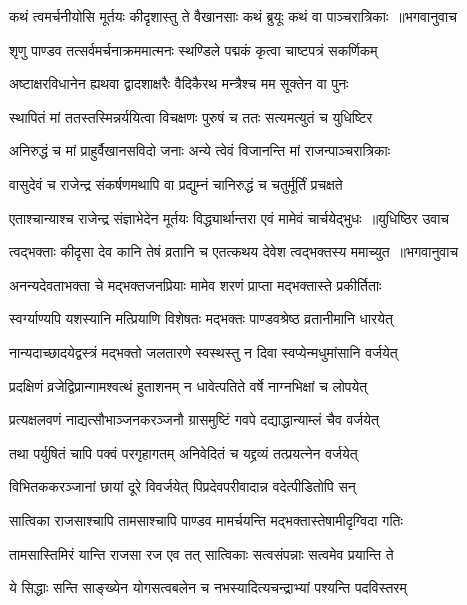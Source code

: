 \threelineshloka
{कथं त्वमर्चनीयोसि मूर्तयः कीदृशास्तु ते}
{वैखानसाः कथं ब्रुयूः कथं वा पाञ्चरात्रिकाः ॥भगवानुवाच}
{}


\twolineshloka
{शृणु पाण्डव तत्सर्वमर्चनाक्रममात्मनः}
{स्थण्डिले पद्मकं कृत्वा चाष्टपत्रं सकर्णिकम्}


\twolineshloka
{अष्टाक्षरविधानेन ह्यथवा द्वादशाक्षरैः}
{वैदिकैरथ मन्त्रैश्च मम सूक्तेन वा पुनः}


\twolineshloka
{स्थापितं मां ततस्तस्मिन्नर्ययित्वा विचक्षणः}
{पुरुषं च ततः सत्यमत्युतं च युधिष्टिर}


\threelineshloka
{अनिरुद्धं च मां प्राहुर्वैखानसविदो जनाः}
{अन्ये त्वेवं विजानन्ति मां राजन्पाञ्चरात्रिकाः}
{}


\twolineshloka
{वासुदेवं च राजेन्द्र संकर्षणमथापि वा}
{प्रद्युम्नं चानिरुद्धं च चतुर्मूर्तिं प्रचक्षते}


\threelineshloka
{एताश्चान्याश्च राजेन्द्र संज्ञाभेदेन मूर्तयः}
{विद्ध्यार्थान्तरा एवं मामेवं चार्चयेद्भुधः ॥युधिष्ठिर उवाच}
{}


\threelineshloka
{त्वद्भक्ताः कीदृसा देव कानि तेषं व्रतानि च}
{एतत्कथय देवेश त्वद्भक्तस्य ममाच्युत ॥भगवानुवाच}
{}


\twolineshloka
{अनन्यदेवताभक्ता चे मद्भक्तजनप्रियाः}
{मामेव शरणं प्राप्ता मद्भक्तास्ते प्रकीर्तिताः}


\twolineshloka
{स्वर्ग्याण्यपि यशस्यानि मत्प्रियाणि विशेषतः}
{मद्भक्तः पाण्डवश्रेष्ठ व्रतानीमानि धारयेत्}


\twolineshloka
{नान्यदाच्छादयेद्वस्त्रं मद्भक्तो जलतारणे}
{स्वस्थस्तु न दिवा स्वप्येन्मधुमांसानि वर्जयेत्}


\twolineshloka
{प्रदक्षिणं व्रजेद्विप्रान्गामश्वत्थं हुताशनम्}
{न धावेत्पतिते वर्षे नाग्नभिक्षां च लोपयेत्}


\twolineshloka
{प्रत्यक्षलवणं नाद्यत्सौभाञ्जनकरञ्जनौ}
{ग्रासमुष्टिं गवपे दद्याद्धान्याम्लं चैव वर्जयेत्}


\twolineshloka
{तथा पर्युषितं चापि पक्वं परगृहागतम्}
{अनिवेदितं च यद्द्रव्यं तत्प्रयत्नेन वर्जयेत्}


\twolineshloka
{विभितककरञ्जानां छायां दूरे विवर्जयेत्}
{पिप्रदेवपरीवादान्न वदेत्पीडितोपि सन्}


\twolineshloka
{सात्विका राजसाश्चापि तामसाश्चापि पाण्डव}
{मामर्चयन्ति मद्भक्तास्तेषामीदृग्विदा गतिः}


\twolineshloka
{तामसास्तिमिरं यान्ति राजसा रज एव तत्}
{सात्विकाः सत्वसंपन्नाः सत्वमेव प्रयान्ति ते}


\twolineshloka
{ये सिद्धाः सन्ति साङ्ख्येन योगसत्वबलेन च}
{नभस्यादित्यचन्द्राभ्यां पश्यन्ति पदविस्तरम्}


